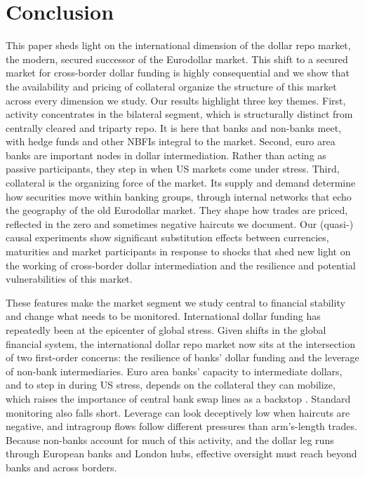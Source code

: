 \documentclass[english, 12pt, oneside]{article}
\begin{document}
\section{Conclusion}
\label{section:conclusion}


This paper sheds light on the international dimension of the dollar repo market, the  modern, secured successor of the Eurodollar market. This shift to a secured market for cross-border dollar funding is highly consequential  and we show that the availability and pricing of collateral organize the structure of this market across every  dimension we study. Our results highlight three key themes. First, activity concentrates in the bilateral segment, which is structurally distinct from centrally cleared and triparty repo. It is here that banks and non-banks meet, with hedge funds and other NBFIs integral to the market. Second, euro area banks are important nodes in dollar intermediation. Rather than acting as passive participants, they step in when US markets come under stress. Third, collateral is the organizing force of the market. Its supply and demand determine how securities move within banking groups, through internal networks that echo the geography of the old Eurodollar market. They  shape how trades are priced, reflected in the zero and sometimes negative haircuts we document. Our (quasi-) causal experiments show significant substitution effects between currencies, maturities and market participants in response to shocks that shed new light on the working of cross-border dollar intermediation and the resilience and potential vulnerabilities of this market.

These features make the market segment we study central to financial stability and change what needs to be monitored. International dollar funding has repeatedly been at the epicenter of global stress. Given shifts in the global financial system, the international dollar repo market now sits at the intersection of two first-order concerns: the resilience of banks' dollar funding and the leverage of non-bank intermediaries. Euro area banks' capacity to intermediate dollars, and to step in during US stress, depends on the collateral they can mobilize, which raises the importance of central bank swap lines as a backstop \citep{bahaj2022, menand2023}. Standard monitoring also falls short. Leverage can look deceptively low when haircuts are negative, and intragroup flows follow different pressures than arm's-length trades. Because non-banks account for much of this activity, and the dollar leg runs through European banks and London hubs, effective oversight must reach beyond banks and across borders.
\end{document}
